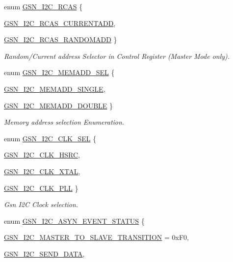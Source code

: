 \begin{DoxyCompactItemize}
enum \hyperlink{a00649_ga714a31fb514e9a5d07a62aadef7cc5f8}{GSN\_\-I2C\_\-RCAS} \{ \par
\hyperlink{a00649_gga714a31fb514e9a5d07a62aadef7cc5f8a190230ad2a9fc15dfc59234aa3f2b498}{GSN\_\-I2C\_\-RCAS\_\-CURRENTADD}, 
\par
\hyperlink{a00649_gga714a31fb514e9a5d07a62aadef7cc5f8a76baa362b7df91bb133cbe4ff24fdb1f}{GSN\_\-I2C\_\-RCAS\_\-RANDOMADD}
 \}
\begin{DoxyCompactList}\small\item\em Random/Current address Selector in Control Register (Master Mode only). \end{DoxyCompactList}\item 
enum \hyperlink{a00649_gaad8f0d778e6fcb233fd5644b770b504e}{GSN\_\-I2C\_\-MEMADD\_\-SEL} \{ \par
\hyperlink{a00649_ggaad8f0d778e6fcb233fd5644b770b504ea0bf65661bf32f831e8de0f9efe265713}{GSN\_\-I2C\_\-MEMADD\_\-SINGLE}, 
\par
\hyperlink{a00649_ggaad8f0d778e6fcb233fd5644b770b504ea576baa1b26cdfcf66c0b01a1497086c8}{GSN\_\-I2C\_\-MEMADD\_\-DOUBLE}
 \}
\begin{DoxyCompactList}\small\item\em Memory address selection Enumeration. \end{DoxyCompactList}\item 
enum \hyperlink{a00649_gac428b668a257595f28f3daf1789b22ae}{GSN\_\-I2C\_\-CLK\_\-SEL} \{ \par
\hyperlink{a00649_ggac428b668a257595f28f3daf1789b22aea7d53c94ea61f351a141475d3e6baa2a1}{GSN\_\-I2C\_\-CLK\_\-HSRC}, 
\par
\hyperlink{a00649_ggac428b668a257595f28f3daf1789b22aeae80d5209c31a33e9c27d85cef9b739a3}{GSN\_\-I2C\_\-CLK\_\-XTAL}, 
\par
\hyperlink{a00649_ggac428b668a257595f28f3daf1789b22aea8142d42036e3e241cafb4e697a86da5a}{GSN\_\-I2C\_\-CLK\_\-PLL}
 \}
\begin{DoxyCompactList}\small\item\em Gsn I2C Clock selection. \end{DoxyCompactList}\item 
enum \hyperlink{a00649_ga409f34aceadb7ed6f56c6aac57ab4087}{GSN\_\-I2C\_\-ASYN\_\-EVENT\_\-STATUS} \{ \par
\hyperlink{a00649_gga409f34aceadb7ed6f56c6aac57ab4087a335509d5bc336dc347e70de98d920e47}{GSN\_\-I2C\_\-MASTER\_\-TO\_\-SLAVE\_\-TRANSITION} =  0xF0, 
\par
\hyperlink{a00649_gga409f34aceadb7ed6f56c6aac57ab4087a25e43eceed994fb8bdf29e4dd92a7255}{GSN\_\-I2C\_\-SEND\_\-DATA}, 

\end{DoxyCompactItemize}
